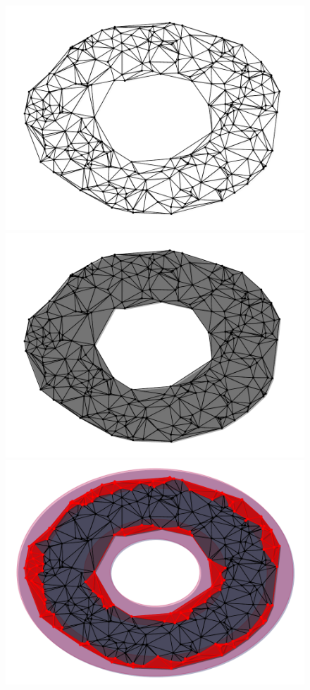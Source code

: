 \begin{figure}[htbp]
\centering
    \includegraphics[scale=0.33]{figures/boundary_graph.pdf}
    \includegraphics[scale=0.33]{figures/boundary_complex.pdf}
    \includegraphics[scale=0.33]{figures/boundary_complex_domain_fence.pdf}

\end{figure}
